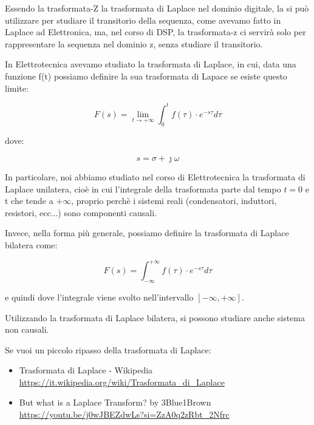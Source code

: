 \begin{tcolorbox}
    Essendo la trasformata-Z la trasformata di Laplace nel dominio digitale, 
    la si può utilizzare per studiare il transitorio della sequenza, come avevamo fatto in Laplace ad Elettronica, 
    ma, nel corso di DSP, la trasformata-z ci servirà solo per rappresentare la sequenza nel dominio z, senza studiare il transitorio. \newline  

    In Elettrotecnica avevamo studiato la trasformata di Laplace, in cui, data una funzione f(t) possiamo definire la sua trasformata di Lapace se esiste questo limite: 

    {
        \Large 
        \begin{equation}
            F(s) 
            = 
            \lim_{t \to +\infty} 
            \int_{0}^{t}
            f(\tau) \cdot e^{-s \tau}
            d\tau
        \end{equation}
    }

    dove: 

    {
        \Large 
        \begin{equation}
            s = \sigma + \jmath \omega
        \end{equation}
    }

    In particolare, noi abbiamo studiato nel corso di Elettrotecnica la trasformata di Laplace unilatera, 
    cioè in cui l'integrale della trasformata parte dal tempo $t = 0$ e t che tende a $+ \infty$, proprio perchè i sistemi reali (condensatori, induttori, resistori, ecc...) 
    sono componenti causali. \newline 
    
    Invece, nella forma più generale, possiamo definire la trasformata di Laplace bilatera come: 

    {
        \Large 
        \begin{equation}
            F(s) 
            = 
            \int_{- \infty}^{+\infty}
            f(\tau) \cdot e^{-s \tau}
            d\tau
        \end{equation}
    }

    e quindi dove l'integrale viene svolto nell'intervallo $\left[ - \infty, + \infty\right]$. \newline 

    Utilizzando la trasformata di Laplace bilatera, si possono studiare anche sistema non causali. \newline 

    Se vuoi un piccolo ripasso della trasformata di Laplace: 

    \begin{itemize}
        \item Trasformata di Laplace - Wikipedia\\ \url{https://it.wikipedia.org/wiki/Trasformata_di_Laplace} 
        \item But what is a Laplace Transform? by 3Blue1Brown\\ \url{https://youtu.be/j0wJBEZdwLs?si=ZzA0q2zRbt_2Nfrc}
    \end{itemize}
\end{tcolorbox}

